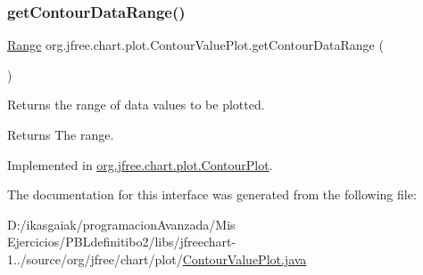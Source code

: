 \subsubsection{\texorpdfstring{get\+Contour\+Data\+Range()}{getContourDataRange()}}
{\footnotesize\ttfamily \mbox{\hyperlink{classorg_1_1jfree_1_1data_1_1_range}{Range}} org.\+jfree.\+chart.\+plot.\+Contour\+Value\+Plot.\+get\+Contour\+Data\+Range (\begin{DoxyParamCaption}{ }\end{DoxyParamCaption})}

Returns the range of data values to be plotted.

\begin{DoxyReturn}{Returns}
The range. 
\end{DoxyReturn}


Implemented in \mbox{\hyperlink{classorg_1_1jfree_1_1chart_1_1plot_1_1_contour_plot_a4afe3f1b90d188371898a0075fa84ea7}{org.\+jfree.\+chart.\+plot.\+Contour\+Plot}}.



The documentation for this interface was generated from the following file\+:\begin{DoxyCompactItemize}
\item 
D\+:/ikasgaiak/programacion\+Avanzada/\+Mis Ejercicios/\+P\+B\+Ldefinitibo2/libs/jfreechart-\/1../source/org/jfree/chart/plot/\mbox{\hyperlink{_contour_value_plot_8java}{Contour\+Value\+Plot.\+java}}\end{DoxyCompactItemize}
